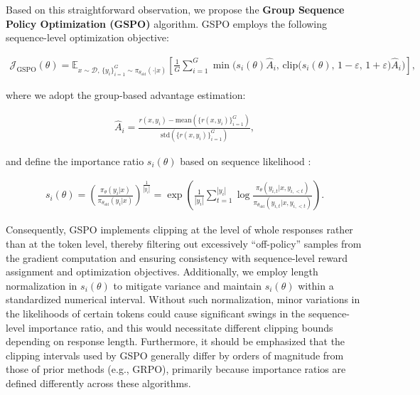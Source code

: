 Based on this straightforward observation, we propose the \textbf{Group Sequence Policy Optimization (GSPO)} algorithm. GSPO employs the following sequence-level optimization objective:

\begin{align}
\mathcal{J}_\text{GSPO} (\theta) =
\mathbb{E}_{ x \sim \mathcal{D},\, \{y_i\}_{i=1}^G \sim \pi_{\theta_\text{old}}( \cdot | x) }
\left[ 
\frac{1}{G} \sum_{i=1}^{G}
\min \bigg( s_{i}(\theta)  \widehat{A}_{i},\,
\mathrm{clip} \big( s_{i}(\theta),\, 1 - {\varepsilon},\, 1 + {\varepsilon} \big) \widehat{A}_{i} \bigg)
\right],
\label{equ:gspo}
\end{align}

where we adopt the group-based advantage estimation:

\begin{align}
\widehat{A}_{i} = \frac{r(x, y_i) - \mathrm{mean} \left( \{ r(x, y_i) \}_{i=1}^G \right) }{ \mathrm{std} \left( \{ r(x, y_i) \}_{i=1}^G \right) },
\end{align}

and define the importance ratio $s_{i}(\theta)$ based on sequence likelihood \citep{click}:

\begin{align}
s_{i}(\theta) = \left( \frac{ \pi_{\theta} (y_i | x) }{ \pi_{\theta_\text{old}} (y_i | x)} \right)^{\frac{1}{|y_i|}}
=
\exp \left( \frac{1}{|y_i|} \sum_{t=1}^{|y_i|} \log \frac{ \pi_{\theta} (y_{i,t} | x, y_{i,<t}) }{ \pi_{\theta_\text{old}} (y_{i,t} | x,y_{i,<t})} \right).
\end{align}

Consequently, GSPO implements clipping at the level of whole responses rather than at the token level, thereby filtering out excessively ``off-policy'' samples from the gradient computation and ensuring consistency with sequence-level reward assignment and optimization objectives. Additionally, we employ length normalization in $s_{i}(\theta)$ to mitigate variance and maintain $s_{i}(\theta)$ within a standardized numerical interval. Without such normalization, minor variations in the likelihoods of certain tokens could cause significant swings in the sequence-level importance ratio, and this would necessitate different clipping bounds depending on response length. Furthermore, it should be emphasized that the clipping intervals used by GSPO generally differ by orders of magnitude from those of prior methods (e.g., GRPO), primarily because importance ratios are defined differently across these algorithms.


